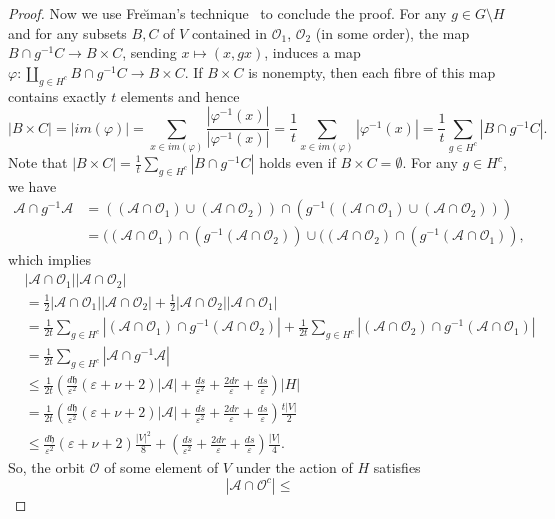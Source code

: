 \documentclass[ALCO,Unicode,published]{cedram}
\newcommand{\mo}{{-1}}
\newcommand{\calO}{\ensuremath{\mathcal{O}}}
\newcommand{\scrA}{\ensuremath{\mathscr{A}}}
\newcommand{\tth}{\ensuremath{\mathfrak{h}}}
\begin{document}
\begin{proof}
Now we use Fre\u{\i}man's technique~\cite{FreimanGroupsInverseProb} to conclude the proof. For any $g\in G \setminus H$ and for any subsets $B, C$ of $V$ contained in $\calO_1$, $\calO_2$ (in some order), the map 
$B\cap g^\mo C \to B\times C$, sending 
$x\mapsto (x, gx)$, induces a map 
$\varphi: \coprod _{g\in H^c} B\cap g^\mo C \to B\times C$. 
If $B \times C$ is nonempty, then each fibre of this map contains exactly $t$ elements and hence 
$$
|B\times C|
= |im(\varphi)|
= \sum_{x\in im(\varphi) } \frac{|\varphi^\mo (x)|} {|\varphi^\mo (x)|}
= \frac 1 t \sum_{x\in im(\varphi)} |\varphi^\mo (x)|
= \frac 1 t \sum_{g\in H^c} |B\cap g^\mo C|.$$
Note that 
$|B\times C|
= \frac 1 t \sum_{g\in H^c} |B\cap g^\mo C|$
holds even if $B \times C = \emptyset$. 
For any $g\in H^c$, we have 
\begin{align*}
\scrA\cap g^\mo \scrA
& = 
((\scrA\cap \calO_1) \cup (\scrA\cap \calO_2))
\cap 
(g^\mo ((\scrA\cap \calO_1) \cup (\scrA\cap \calO_2)))\\
& = 
((\scrA\cap \calO_1) \cap 
(g^\mo (\scrA\cap \calO_2))
\cup 
((\scrA\cap \calO_2) \cap 
(g^\mo (\scrA\cap \calO_1)),
\end{align*}
which implies 
\begin{align*}
& |\scrA \cap \calO_1| |\scrA\cap \calO_2|\\
& = \frac 12 |\scrA \cap \calO_1| |\scrA\cap \calO_2| + 
\frac 12 |\scrA \cap \calO_2| |\scrA\cap \calO_1|\\
& =
\frac 1 {2t} \sum_{g\in H^c} |(\scrA \cap \calO_1) \cap g^\mo (\scrA \cap \calO_2)| 
+ 
\frac 1{2 t} \sum_{g\in H^c} |(\scrA \cap \calO_2) \cap g^\mo (\scrA \cap \calO_1)| \\
& = 
\frac 1 {2t} \sum_{g\in H^c} |\scrA \cap g^\mo \scrA|\\
& 
\leq \frac 1 {2t} 
\left(
\frac{d \tth}{\varepsilon^2} (\varepsilon + \nu + 2)|\scrA| 
+ \frac{ds}{\varepsilon^2} + \frac{2dr}\varepsilon + \frac{ds}{\varepsilon}
\right)|H|\\
& 
= \frac 1 {2t} 
\left(
\frac{d \tth}{\varepsilon^2} (\varepsilon + \nu + 2)|\scrA| 
+\frac{ds}{\varepsilon^2} + \frac{2dr}\varepsilon + \frac{ds}{\varepsilon}
\right)
\frac{t|V|}2\\
& 
\leq 
\frac{d \tth}{\varepsilon^2} (\varepsilon + \nu + 2)
\frac{|V|^2}8
+ 
\left(\frac{ds}{\varepsilon^2} + \frac{2dr}\varepsilon + \frac{ds}{\varepsilon}
\right)
\frac{|V|}4.
\end{align*}
So, the orbit $\calO$ of some element of $V$ under the action of $H$ satisfies 
$$
|\scrA\cap \calO^c| \leq 
$$
\end{proof}
\end{document}

